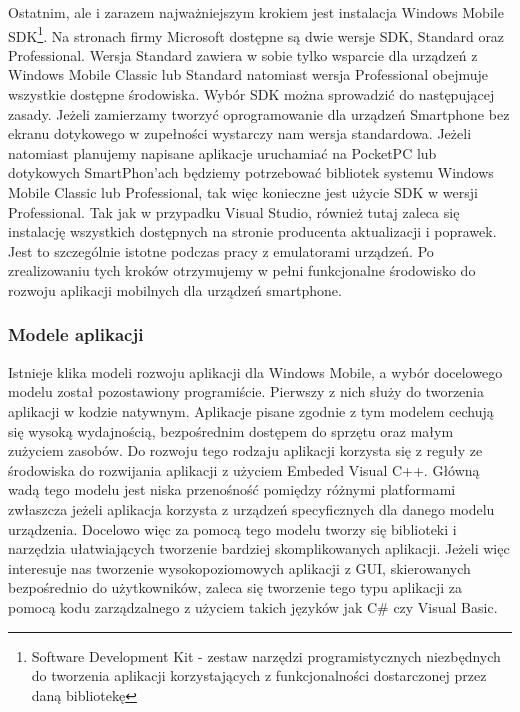 Ostatnim, ale i zarazem najważniejszym krokiem jest instalacja Windows Mobile
SDK\footnote{Software Development Kit - zestaw narzędzi programistycznych
niezbędnych do tworzenia aplikacji korzystających z funkcjonalności dostarczonej
przez daną bibliotekę}. Na stronach firmy Microsoft dostępne są dwie wersje SDK,
Standard oraz Professional. Wersja Standard zawiera w sobie tylko wsparcie dla
urządzeń z Windows Mobile Classic lub Standard natomiast wersja Professional
obejmuje wszystkie dostępne środowiska. Wybór SDK można sprowadzić do
następującej zasady. Jeżeli zamierzamy tworzyć oprogramowanie dla urządzeń
Smartphone bez ekranu dotykowego w zupełności wystarczy nam wersja standardowa.
Jeżeli natomiast planujemy napisane aplikacje uruchamiać na PocketPC lub
dotykowych SmartPhon'ach będziemy potrzebować bibliotek systemu Windows Mobile
Classic lub Professional, tak więc konieczne jest użycie SDK w wersji
Professional. Tak jak w przypadku Visual Studio, również tutaj zaleca się
instalację wszystkich dostępnych na stronie producenta aktualizacji i poprawek.
Jest to szczególnie istotne podczas pracy z emulatorami urządzeń. Po
zrealizowaniu tych kroków otrzymujemy w pełni funkcjonalne środowisko do rozwoju
aplikacji mobilnych dla urządzeń smartphone.

\subsubsection{Modele aplikacji}
Istnieje klika modeli rozwoju aplikacji dla Windows Mobile, a wybór docelowego
modelu został pozostawiony programiście. Pierwszy z nich służy do tworzenia
aplikacji w kodzie natywnym. Aplikacje pisane zgodnie z tym modelem cechują się
wysoką wydajnością, bezpośrednim dostępem do sprzętu oraz małym zużyciem
zasobów. Do rozwoju tego rodzaju aplikacji korzysta się z reguły ze środowiska do
rozwijania aplikacji z użyciem Embeded Visual C++. Główną wadą tego modelu jest
niska przenośność pomiędzy różnymi platformami zwłaszcza jeżeli aplikacja
korzysta z urządzeń specyficznych dla danego modelu urządzenia. Docelowo więc za
pomocą tego modelu tworzy się biblioteki i narzędzia ułatwiających tworzenie
bardziej skomplikowanych aplikacji. Jeżeli więc interesuje nas tworzenie
wysokopoziomowych aplikacji z GUI, skierowanych bezpośrednio do użytkowników,
zaleca się tworzenie tego typu aplikacji za pomocą kodu zarządzalnego z użyciem
takich języków jak C\# czy Visual Basic. 

